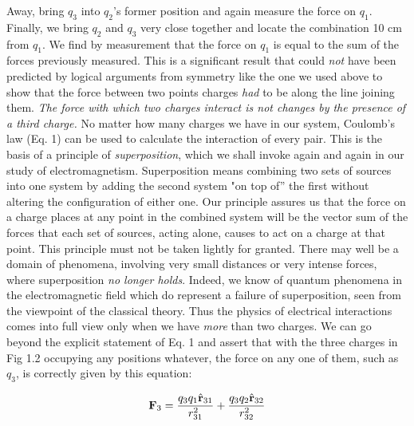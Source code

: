 Away, bring $q_3$ into $q_2$'s former position and again measure the
force on $q_1$. Finally, we bring $q_2$ and $q_3$ very close together
and locate the combination 10 cm from $q_1$. We find by measurement
that the force on $q_1$ is equal to the sum of the forces previously
measured. This is a significant result that could \emph{not} have
been predicted by logical arguments from symmetry like the one we
used above to show that the force between two points charges
\emph{had} to be along the line joining them. \emph{The force with
which two charges interact is not changes by the presence of a third
charge.} No matter how many charges we have in our system, Coulomb's
law (Eq. 1) can be used to calculate the interaction of every pair.
This is the basis of a principle of \emph{superposition}, which we
shall invoke again and again in our study of electromagnetism.
Superposition means combining two sets of sources into one system by
adding the second system "on top of'' the first without altering the
configuration of either one. Our principle assures us that the force
on a charge places at any point in the combined system will be the
vector sum of the forces that each set of sources, acting alone,
causes to act on a charge at that point. This principle must not be
taken lightly for granted. There may well be a domain of phenomena,
involving very small distances or very intense forces, where
superposition \emph{no longer holds}.  Indeed, we know of quantum
phenomena in the electromagnetic field which do represent a failure
of superposition, seen from the viewpoint of the classical theory.
Thus the physics of electrical interactions comes into full view only
when we have \emph{more} than two charges. We can go beyond the
explicit statement of Eq. 1 and assert that with the three charges in
Fig 1.2 occupying any positions whatever, the force on any one of
them, such as $q_3$, is correctly given by this equation: 

\begin{equation}
\mathbf{F}_3= \frac{q_3q_1\hat{\mathbf{r}}_{31}}{r_{31}^2}+\frac{q_3q_2\hat{\mathbf{r}}_{32}}{r_{32}^2}
\end{equation}

